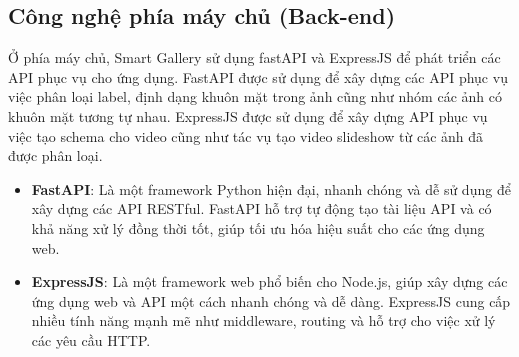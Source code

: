 \subsection{Công nghệ phía máy chủ (Back-end)}

Ở phía máy chủ, Smart Gallery sử dụng fastAPI và ExpressJS để phát triển các API phục vụ cho ứng dụng. FastAPI được sử dụng để xây dựng các API phục vụ việc phân loại label, định dạng khuôn mặt trong ảnh cũng như nhóm các ảnh có khuôn mặt tương tự nhau. ExpressJS được sử dụng để xây dựng API phục vụ việc tạo schema cho video cũng như tác vụ tạo video slideshow từ các ảnh đã được phân loại.
\begin{itemize}
    \item \textbf{FastAPI}\cite{fastapidoc}: Là một framework Python hiện đại, nhanh chóng và dễ sử dụng để xây dựng các API RESTful. FastAPI hỗ trợ tự động tạo tài liệu API và có khả năng xử lý đồng thời tốt, giúp tối ưu hóa hiệu suất cho các ứng dụng web.
    
    \item \textbf{ExpressJS}\cite{expressjsdoc}: Là một framework web phổ biến cho Node.js, giúp xây dựng các ứng dụng web và API một cách nhanh chóng và dễ dàng. ExpressJS cung cấp nhiều tính năng mạnh mẽ như middleware, routing và hỗ trợ cho việc xử lý các yêu cầu HTTP.
\end{itemize}
